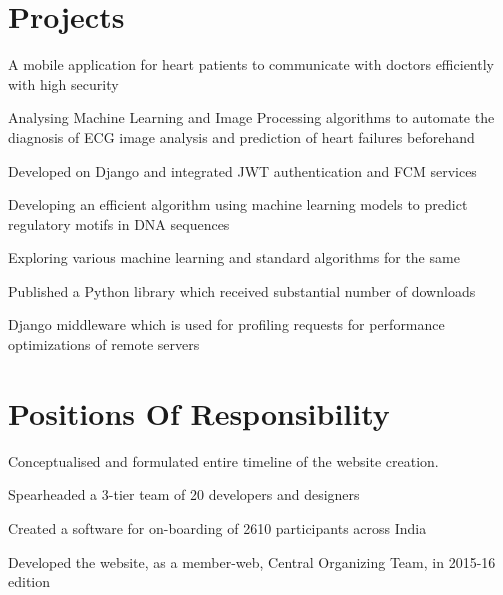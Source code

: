 \documentclass[]{deedy-resume-openfont}
\begin{document}
\begin{minipage}[t]{0.66\textwidth}
\section{Projects}
\begin{tightemize}
\item A mobile application for heart patients to communicate with doctors efficiently with high security
\item Analysing Machine Learning and Image Processing algorithms to automate
the diagnosis of ECG image analysis and prediction of heart failures beforehand
\item Developed on Django and integrated JWT authentication and FCM services
\end{tightemize}
\sectionsep

\begin{tightemize}
\item Developing an efficient algorithm using machine learning models to predict regulatory motifs in DNA sequences
\item Exploring various machine learning and standard algorithms for the same
\end{tightemize}
\sectionsep

\begin{tightemize}
\item Published a Python library which received substantial number of downloads
\item Django middleware which is used for profiling requests for performance optimizations of remote servers
\end{tightemize}
\sectionsep


\section{Positions Of Responsibility}
\begin{tightemize}
\item Conceptualised and formulated entire timeline of the website creation.
\item  Spearheaded a 3-tier team of 20 developers and designers
\item Created a software for on-boarding of 2610 participants across India
\item Developed the website, as a member-web, Central Organizing Team, in 2015-16 edition
\end{tightemize}
\sectionsep



\end{minipage}
\end{document}
